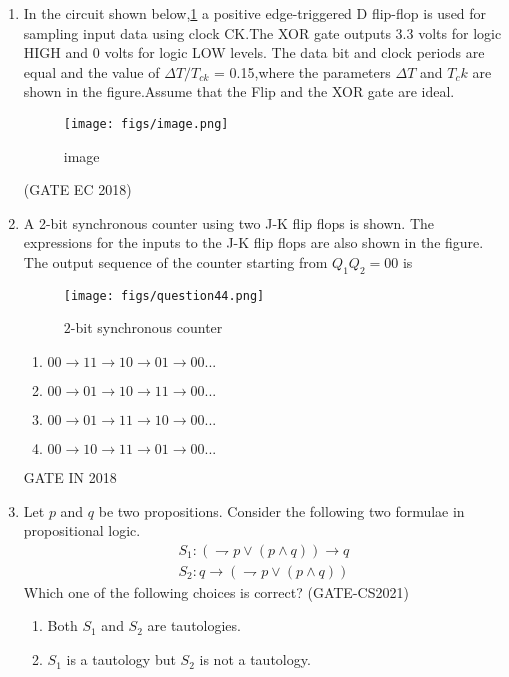 \begin{enumerate}
\item In the circuit shown below,\ref{fig:image} a positive edge-triggered D flip-flop is used for sampling input data
 using clock CK.The XOR gate outputs 3.3 volts for logic HIGH and 0 volts for logic LOW levels.
The data bit and clock periods are equal and the value of $ \Delta T / T_{ck} $ = 0.15,where
the parameters $ \Delta T $ and $ T_ck$ are shown in the figure.Assume  that the Flip and
the XOR gate are ideal.  
\begin{figure}[!ht] 
    \texttt{[image: figs/image.png]} 
    \caption{image}
    \label{fig:image}
 \end{figure}
\label{fig:2018-gate-ec-46}
\hfill(GATE EC 2018)
\item A 2-bit synchronous counter using two J-K flip flops is shown. The expressions for the inputs to the J-K flip flops are also shown in the figure. The output sequence of the counter starting from $Q_1Q_2 = 00$ is 
\begin{figure}[!ht]
	\centering
	\texttt{[image: figs/question44.png]}
	\caption{$2$-bit synchronous counter}
	\label{fig:enter-label}
\end{figure}
\begin{enumerate}
	\item $00\rightarrow11\rightarrow10\rightarrow01\rightarrow00...$ 
        \item $00\rightarrow01\rightarrow10\rightarrow11\rightarrow00...$
        \item $00\rightarrow01\rightarrow11\rightarrow10\rightarrow00...$
        \item $00\rightarrow10\rightarrow11\rightarrow01\rightarrow00...$
\end{enumerate}
\hfill{GATE IN 2018}
        \item Let $p$ and $q$ be two propositions. Consider the following two formulae in propositional logic.
			\begin{align}
				 S_1 : ( \rightharpoondown p \vee (p \wedge q))\rightarrow q \\
				 S_2 : q\rightarrow(\rightharpoondown p \vee (p \wedge q))
			\end{align}
        Which one of the following choices is correct?
		                                          \hfill(GATE-CS2021)
		\begin{enumerate}[label=(\Alph*)]
			\item Both $S_1$ and $S_2$ are tautologies.
			\item $S_1$ is a tautology but $S_2$ is not a tautology.

\end{enumerate}
\end{enumerate}
